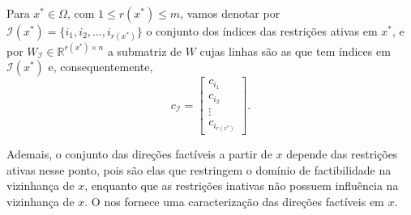 \documentclass[12pt,a4paper]{scrartcl}
\def\RR{\mathds{R}}
\theoremstyle{definition}%
\begin{document}
Para $x^{*} \in \Omega$, com $1 \leq r(x^{*}) \leq m$, vamos denotar por $\mathcal{I}(x^{*}) = \{ i_{1}, i_{2}, \ldots , i_{r(x^{*})} \}$ o conjunto dos índices das restrições ativas em $x^{*}$, e por $W_{\mathcal{I}} \in \RR^{r(x^{*})\times n}$ a submatriz de $W$ cujas linhas são as que tem índices em $\mathcal{I}(x^{*})$ e, consequentemente, 
\[
c_{\mathcal{I}} = \begin{bmatrix*} c_{i_{1}} \\ c_{i_{2}} \\ \vdots \\ c_{i_{r(x^{*})}} \end{bmatrix*} .
\]

Ademais, o conjunto das direções factíveis a partir de $x$ depende das restrições ativas nesse ponto, pois são elas que restringem o domínio de factibilidade na vizinhança de $x$, enquanto que as restrições inativas não possuem influência na vizinhança de $x$.
O  nos fornece uma caracterização das direções factíveis em $x$.
\end{document}
